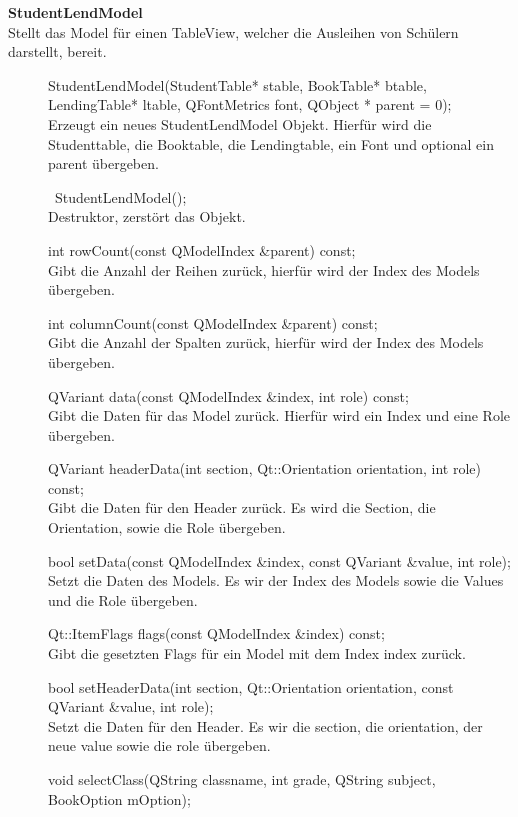 \textbf{StudentLendModel}\\
Stellt das Model für einen TableView, welcher die Ausleihen von Schülern darstellt, bereit.
\begin{description}
    \item[ ] StudentLendModel(StudentTable* stable, BookTable* btable, LendingTable* ltable, QFontMetrics font, QObject * parent = 0); \\
    Erzeugt ein neues StudentLendModel Objekt. Hierfür wird die Studenttable, die Booktable, die Lendingtable, ein Font und optional ein parent übergeben.
    \item[ ] ~StudentLendModel(); \\
    Destruktor, zerstört das Objekt.
    \item[ ] int rowCount(const QModelIndex \&parent) const; \\
    Gibt die Anzahl der Reihen zurück, hierfür wird der Index des Models übergeben.
    \item[ ] int columnCount(const QModelIndex \&parent) const; \\
    Gibt die Anzahl der Spalten zurück, hierfür wird der Index des Models übergeben.
    \item[ ] QVariant data(const QModelIndex \&index, int role) const; \\
    Gibt die Daten für das Model zurück. Hierfür wird ein Index und eine Role übergeben.
    \item[ ] QVariant headerData(int section, Qt::Orientation orientation, int role) const; \\
    Gibt die Daten für den Header zurück. Es wird die Section, die Orientation, sowie die Role übergeben.
    \item[ ] bool setData(const QModelIndex \&index, const QVariant \&value, int role); \\
    Setzt die Daten des Models. Es wir der Index des Models sowie die Values und die Role übergeben.
    \item[ ] Qt::ItemFlags flags(const QModelIndex \&index) const; \\
    Gibt die gesetzten Flags für ein Model mit dem Index index zurück.
    \item[ ] bool setHeaderData(int section, Qt::Orientation orientation, const QVariant \&value, int role); \\
    Setzt die Daten für den Header. Es wir die section, die orientation, der neue value sowie die role übergeben.
    \item[ ] void selectClass(QString classname, int grade, QString subject, BookOption mOption); \\

\end{description}
